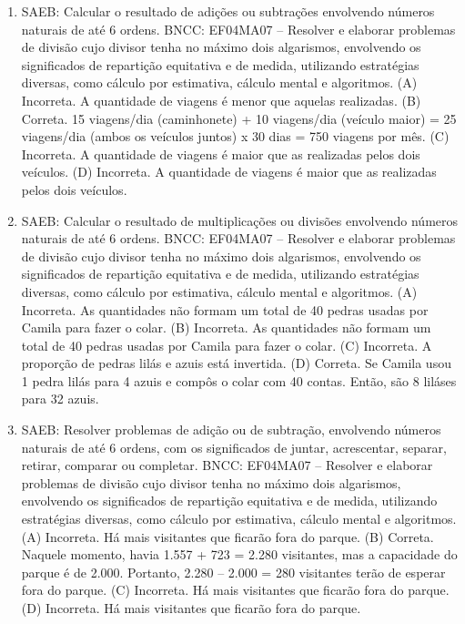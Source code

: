 \begin{enumerate}
\item
SAEB: Calcular o resultado de adições ou subtrações envolvendo números naturais de até 6 ordens.
BNCC: EF04MA07 -- Resolver e elaborar problemas de divisão cujo divisor tenha no máximo dois algarismos,
envolvendo os significados de repartição equitativa e de medida, utilizando estratégias diversas,
como cálculo por estimativa, cálculo mental e algoritmos.
(A) Incorreta. A quantidade de viagens é menor que aquelas realizadas.
(B) Correta. 15 viagens/dia (caminhonete) + 10 viagens/dia (veículo maior) = 25 viagens/dia (ambos os veículos juntos) x 30 dias = 750 viagens por mês.
(C) Incorreta. A quantidade de viagens é maior que as realizadas pelos dois veículos.
(D) Incorreta. A quantidade de viagens é maior que as realizadas pelos dois veículos.

\item
SAEB: Calcular o resultado de multiplicações ou divisões envolvendo números naturais de até 6 ordens.
BNCC: EF04MA07 -- Resolver e elaborar problemas de divisão cujo divisor tenha no máximo dois algarismos,
envolvendo os significados de repartição equitativa e de medida, utilizando estratégias diversas,
como cálculo por estimativa, cálculo mental e algoritmos.
(A) Incorreta. As quantidades não formam um total de 40 pedras usadas por Camila para fazer o colar.
(B) Incorreta. As quantidades não formam um total de 40 pedras usadas por Camila para fazer o colar.
(C) Incorreta. A proporção de pedras lilás e azuis está invertida.
(D) Correta. Se Camila usou 1 pedra lilás para 4 azuis e compôs o colar com 40 contas. Então, são 8 liláses para 32 azuis.

\item
SAEB: Resolver problemas de adição ou de subtração, envolvendo números naturais de até 6 ordens, com os significados de juntar, acrescentar, separar, retirar, comparar ou completar.
BNCC: EF04MA07 -- Resolver e elaborar problemas de divisão cujo divisor tenha no máximo dois algarismos,
envolvendo os significados de repartição equitativa e de medida, utilizando estratégias diversas,
como cálculo por estimativa, cálculo mental e algoritmos.
(A) Incorreta. Há mais visitantes que ficarão fora do parque.
(B) Correta. Naquele momento, havia 1.557 + 723 = 2.280 visitantes, mas a capacidade do parque é de 2.000. Portanto, 2.280 -- 2.000 = 280 visitantes terão de esperar fora do parque.
(C) Incorreta. Há mais visitantes que ficarão fora do parque.
(D) Incorreta. Há mais visitantes que ficarão fora do parque.
\end{enumerate}

